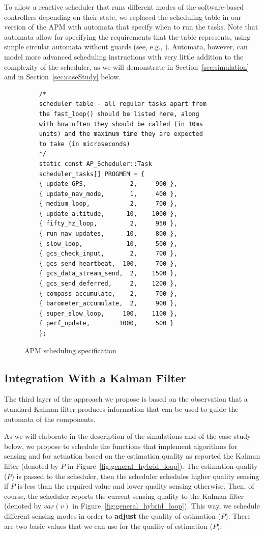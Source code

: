 \documentclass[ twoside, 12pt ]{article}
\begin{document}
To allow a reactive scheduler that runs different modes of the software-based controllers depending on their state, we replaced the scheduling table in our version of the APM with automata that specify when to run the tasks. Note that automata allow for specifying the requirements that the table represents, using simple circular automata without guards (see, e.g., \cite{weiss2007automata}). Automata, however, can model more advanced scheduling instructions with very little addition to the complexity of the scheduler, as we will demonstrate in Section~\ref{sec:simulation} and in Section~\ref{sec:caseStudy} below.

\begin{figure}
    \scriptsize
    \begin{lstlisting}
    /*
    scheduler table - all regular tasks apart from
    the fast_loop() should be listed here, along 
    with how often they should be called (in 10ms 
    units) and the maximum time they are expected 
    to take (in microseconds)
    */
    static const AP_Scheduler::Task 
    scheduler_tasks[] PROGMEM = {
    { update_GPS,            2,     900 },
    { update_nav_mode,       1,     400 },
    { medium_loop,           2,     700 },
    { update_altitude,      10,    1000 },
    { fifty_hz_loop,         2,     950 },
    { run_nav_updates,      10,     800 },
    { slow_loop,            10,     500 },
    { gcs_check_input,       2,     700 },
    { gcs_send_heartbeat,  100,     700 },
    { gcs_data_stream_send,  2,    1500 },
    { gcs_send_deferred,     2,    1200 },
    { compass_accumulate,    2,     700 },
    { barometer_accumulate,  2,     900 },
    { super_slow_loop,     100,    1100 },
    { perf_update,        1000,     500 }
    };
    \end{lstlisting}
    \caption{APM scheduling specification}
    \label{fig:apm-scheduler} 
\end{figure}

\subsection{Integration With a Kalman Filter}
\label{sec:Arch-kalman}
The third layer of the approach we propose is based on the observation that a standard Kalman filter produces information that can be used to guide the automata of the components. 

As we will elaborate in the description of the simulations and of the case study below, we propose to schedule the functions that implement algorithms for sensing and for actuation based on the estimation quality as reported the Kalman filter (denoted by $P$ in Figure~\ref{fig:general_hybrid_loop}).
The estimation quality ($P$) is passed to the scheduler, then the scheduler schedules higher quality sensing if $P$ is less than the required value and lower quality sensing otherwise. Then, of course, the scheduler reports the current sensing quality to the Kalman filter (denoted by $var(v)$ in Figure~\ref{fig:general_hybrid_loop}).   
This way, we schedule different sensing modes in order to \textbf{adjust} the quality of estimation ($P$).
There are two basic values that we can use for the quality of estimation ($P$):
\end{document}
